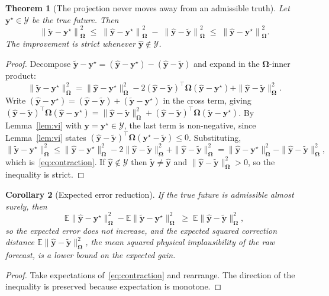 \documentclass[11pt]{article}
\theoremstyle{plain}
\newtheorem{theorem}{Theorem}
\newtheorem{corollary}[theorem]{Corollary}
\theoremstyle{definition}
\theoremstyle{remark}
\newcommand{\by}{\bm{y}}
\newcommand{\bOm}{\bm{\Omega}}
\newcommand{\yhat}{\hat{\by}}
\newcommand{\ytil}{\tilde{\by}}
\newcommand{\cY}{\mathcal{Y}}
\newif\ifrevisionmarkup
\newcommand{\new}[1]{\ifrevisionmarkup\textcolor{revision}{#1}\else#1\fi}
\begin{document}
\begin{theorem}[The projection never moves away from an admissible truth]
\label{thm:contraction}
Let $\by^{\star} \in \cY$ be the true future. Then
\begin{equation}
\left\| \ytil - \by^{\star} \right\|_{\bOm}^{2}
\;\le\;
\left\| \yhat - \by^{\star} \right\|_{\bOm}^{2}
\;-\;
\left\| \yhat - \ytil \right\|_{\bOm}^{2}
\;\le\;
\left\| \yhat - \by^{\star} \right\|_{\bOm}^{2}.
\label{eq:contraction}
\end{equation}
The improvement is strict whenever $\yhat \notin \cY$.
\end{theorem}
\begin{proof}
Decompose $\ytil - \by^{\star} = (\yhat - \by^{\star}) - (\yhat - \ytil)$ and expand in the $\bOm$-inner product:
\[
\|\ytil-\by^{\star}\|_{\bOm}^{2}
= \|\yhat-\by^{\star}\|_{\bOm}^{2} - 2(\yhat-\ytil)^{\top}\bOm(\yhat-\by^{\star}) + \|\yhat-\ytil\|_{\bOm}^{2}.
\]
Write $(\yhat-\by^{\star}) = (\yhat-\ytil) + (\ytil-\by^{\star})$ in the cross term, giving
$(\yhat-\ytil)^{\top}\bOm(\yhat-\by^{\star}) = \|\yhat-\ytil\|_{\bOm}^{2} + (\yhat-\ytil)^{\top}\bOm(\ytil-\by^{\star})$.
By Lemma~\ref{lem:vi} with $\by = \by^{\star} \in \cY$, the last term is non-negative, since Lemma~\ref{lem:vi} states $(\yhat-\ytil)^{\top}\bOm(\by^{\star}-\ytil) \le 0$. Substituting,
\[
\|\ytil-\by^{\star}\|_{\bOm}^{2}
\le \|\yhat-\by^{\star}\|_{\bOm}^{2} - 2\|\yhat-\ytil\|_{\bOm}^{2} + \|\yhat-\ytil\|_{\bOm}^{2}
= \|\yhat-\by^{\star}\|_{\bOm}^{2} - \|\yhat-\ytil\|_{\bOm}^{2},
\]
which is~\eqref{eq:contraction}. If $\yhat \notin \cY$ then $\ytil \ne \yhat$ and $\|\yhat-\ytil\|_{\bOm}^{2}>0$, so the inequality is strict.
\end{proof}

\begin{corollary}[Expected error reduction]
\label{cor:expected}
If the true future is admissible almost surely, then
\begin{equation}
\mathbb{E}\|\yhat-\by^{\star}\|_{\bOm}^{2} - \mathbb{E}\|\ytil-\by^{\star}\|_{\bOm}^{2}
\;\new{\ge}\;
\mathbb{E}\|\yhat-\ytil\|_{\bOm}^{2},
\label{eq:expectedgain}
\end{equation}
so the expected error does not increase, and the expected squared correction distance $\mathbb{E}\|\yhat-\ytil\|_{\bOm}^{2}$, the mean squared physical implausibility of the raw forecast, is a \new{lower bound on} the expected gain.
\end{corollary}
\begin{proof}
\new{Take expectations of~\eqref{eq:contraction} and rearrange. The direction of the inequality is preserved because expectation is monotone.}
\end{proof}
\end{document}
